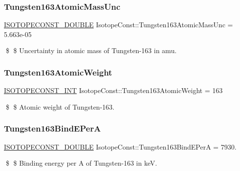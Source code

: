 \subsubsection{\texorpdfstring{Tungsten163\+Atomic\+Mass\+Unc}{Tungsten163AtomicMassUnc}}
{\footnotesize\ttfamily \mbox{\hyperlink{group___isotope_const-_macros_ga8f45a7272ce02c0b4c65c44636ed719a}{I\+S\+O\+T\+O\+P\+E\+C\+O\+N\+S\+T\+\_\+\+D\+O\+U\+B\+LE}} Isotope\+Const\+::\+Tungsten163\+Atomic\+Mass\+Unc = 5.\+663e-\/05}

\$ \$ Uncertainty in atomic mass of Tungsten-\/163 in amu. \mbox{\label{group___isotope_const-_tungsten-_w163_ga0ed2e46e8924422a401df75fab114d5b}} 
\subsubsection{\texorpdfstring{Tungsten163\+Atomic\+Weight}{Tungsten163AtomicWeight}}
{\footnotesize\ttfamily \mbox{\hyperlink{group___isotope_const-_macros_ga5f18360b3e99483a35c32d789e62621c}{I\+S\+O\+T\+O\+P\+E\+C\+O\+N\+S\+T\+\_\+\+I\+NT}} Isotope\+Const\+::\+Tungsten163\+Atomic\+Weight = 163}

\$ \$ Atomic weight of Tungsten-\/163. \mbox{\label{group___isotope_const-_tungsten-_w163_ga5e3d4bd4310eac619cb2277df3215bc3}} 
\subsubsection{\texorpdfstring{Tungsten163\+Bind\+E\+PerA}{Tungsten163BindEPerA}}
{\footnotesize\ttfamily \mbox{\hyperlink{group___isotope_const-_macros_ga8f45a7272ce02c0b4c65c44636ed719a}{I\+S\+O\+T\+O\+P\+E\+C\+O\+N\+S\+T\+\_\+\+D\+O\+U\+B\+LE}} Isotope\+Const\+::\+Tungsten163\+Bind\+E\+PerA = 7930.}

\$ \$ Binding energy per A of Tungsten-\/163 in keV. \mbox{\label{group___isotope_const-_tungsten-_w163_gaadbd3b06be970e24cac27060ab5fe590}} 
